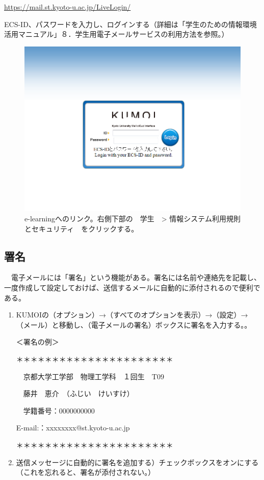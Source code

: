 \url{https://mail.st.kyoto-u.ac.jp/LiveLogin/}

ECS-ID、パスワードを入力し、ログインする（詳細は「学生のための情報環境活用マニュアル」８．学生用電子メールサービスの利用方法を参照。）

\begin{figure}
\centering
\includegraphics[width=13cm]{TeX_files/figs2/Kumoi.png}
\caption{
\label{fig:Kumoi}
e-learningへのリンク。右側下部の　学生　> 情報システム利用規則とセキュリティ　をクリックする。
}
\end{figure}

\subsection{署名}
　電子メールには「署名」という機能がある。署名には名前や連絡先を記載し、一度作成して設定しておけば、送信するメールに自動的に添付されるので便利である。

\begin{enumerate}
\item KUMOIの（オプション）→（すべてのオプションを表示）→（設定）→（メール）と移動し、（電子メールの署名）ボックスに署名を入力する。。

＜署名の例＞

＊＊＊＊＊＊＊＊＊＊＊＊＊＊＊＊＊＊＊＊＊＊

　京都大学工学部　物理工学科　１回生　T09

　藤井　恵介　（ふじい　けいすけ）

　学籍番号：0000000000

E-mail:：xxxxxxxx@st.kyoto-u.ac.jp

＊＊＊＊＊＊＊＊＊＊＊＊＊＊＊＊＊＊＊＊＊＊

\item 送信メッセージに自動的に署名を追加する）チェックボックスをオンにする（これを忘れると、署名が添付されない。）
\end{enumerate}

